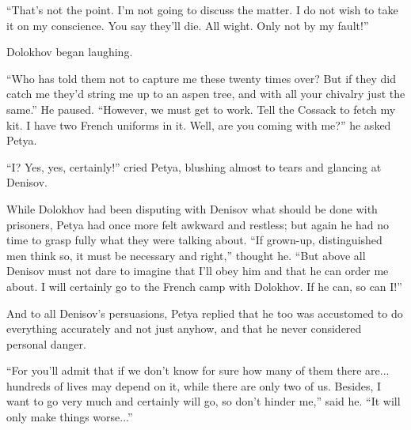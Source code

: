``That's not the point. I'm not going to discuss the matter. I do
not wish to take it on my conscience. You say they'll die. All
wight. Only not by my fault!''

Dolokhov began laughing.

``Who has told them not to capture me these twenty times over?
But if they did catch me they'd string me up to an aspen tree,
and with all your chivalry just the same.'' He paused. ``However,
we must get to work.  Tell the Cossack to fetch my kit. I have
two French uniforms in it.  Well, are you coming with me?'' he
asked Petya.

``I? Yes, yes, certainly!'' cried Petya, blushing almost to tears
and glancing at Denisov.

While Dolokhov had been disputing with Denisov what should be
done with prisoners, Petya had once more felt awkward and
restless; but again he had no time to grasp fully what they were
talking about. ``If grown-up, distinguished men think so, it must
be necessary and right,'' thought he.  ``But above all Denisov
must not dare to imagine that I'll obey him and that he can order
me about. I will certainly go to the French camp with
Dolokhov. If he can, so can I!''

And to all Denisov's persuasions, Petya replied that he too was
accustomed to do everything accurately and not just anyhow, and
that he never considered personal danger.

``For you'll admit that if we don't know for sure how many of
them there are... hundreds of lives may depend on it, while there
are only two of us. Besides, I want to go very much and certainly
will go, so don't hinder me,'' said he. ``It will only make
things worse...''


